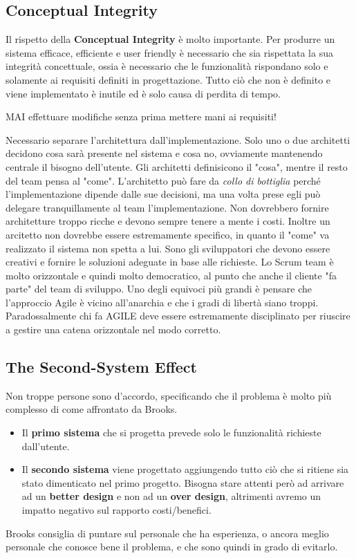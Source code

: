 \subsection{Conceptual Integrity}
Il rispetto della \textbf{Conceptual Integrity} è molto importante. Per produrre un sistema efficace, efficiente e user friendly è necessario che sia rispettata la sua integrità concettuale, ossia è necessario che le funzionalità rispondano solo e solamente ai requisiti definiti in progettazione. Tutto ciò che non è definito e viene implementato è inutile ed è solo causa di perdita di tempo.
\begin{warn}
	MAI effettuare modifiche senza prima mettere mani ai requisiti!
\end{warn}
Necessario separare l'architettura dall'implementazione. Solo uno o due architetti decidono cosa sarà presente nel sistema e cosa no, ovviamente mantenendo centrale il bisogno dell'utente. Gli architetti definisicono il "cosa", mentre il resto del team pensa al "come". L'architetto può fare da \textit{collo di bottiglia} perché l'implementazione dipende dalle sue decisioni, ma una volta prese egli può delegare tranquillamente al team l'implementazione. Non dovrebbero fornire architetture troppo ricche e devono sempre tenere a mente i costi. Inoltre un arcitetto non dovrebbe essere estremamente specifico, in quanto il "come" va realizzato il sistema non spetta a lui. Sono gli sviluppatori che devono essere creativi e fornire le soluzioni adeguate in base alle richieste.\newline
Lo Scrum team è molto orizzontale e quindi molto democratico, al punto che anche il cliente "fa parte" del team di sviluppo. Uno degli equivoci più grandi è pensare che l'approccio Agile è vicino all'anarchia e che i gradi di libertà siano troppi. Paradossalmente chi fa AGILE deve essere estremamente disciplinato per riuscire a gestire una catena orizzontale nel modo corretto.
\subsection{The Second-System Effect}
Non troppe persone sono d'accordo, specificando che il problema è molto più complesso di come affrontato da Brooks.
\begin{itemize}
	\item Il \textbf{primo sistema} che si progetta prevede solo le funzionalità richieste dall'utente.
	\item Il \textbf{secondo sistema} viene progettato aggiungendo tutto ciò che si ritiene sia stato dimenticato nel primo progetto. Bisogna stare attenti però ad arrivare ad un \textbf{better design} e non ad un \textbf{over design}, altrimenti avremo un impatto negativo sul rapporto costi/benefici.
\end{itemize}
Brooks consiglia di puntare sul personale che ha esperienza, o ancora meglio personale che conosce bene il problema, e che sono quindi in grado di evitarlo.
